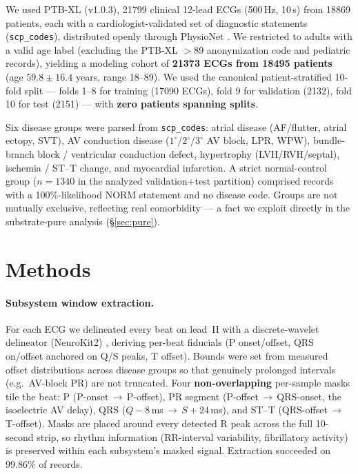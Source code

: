 \documentclass[11pt]{article}
\begin{document}
We used PTB-XL (v1.0.3), \num{21799} clinical 12-lead ECGs (500\,Hz, 10\,s) from \num{18869}
patients, each with a cardiologist-validated set of diagnostic statements
(\texttt{scp\_codes}), distributed openly through PhysioNet \citep{wagner2020ptbxl,
goldberger2000physionet}. We restricted to adults with a valid age label (excluding the
PTB-XL $>$89 anonymization code and pediatric records), yielding a modeling cohort of
\textbf{\num{21373} ECGs from \num{18495} patients} (age $59.8 \pm 16.4$ years, range 18--89).
We used the canonical patient-stratified 10-fold split --- folds 1--8 for training
(\num{17090} ECGs), fold 9 for validation (\num{2132}), fold 10 for test (\num{2151}) --- with
\textbf{zero patients spanning splits}.

Six disease groups were parsed from \texttt{scp\_codes}: atrial disease (AF/flutter, atrial
ectopy, SVT), AV conduction disease ($1^\circ$/$2^\circ$/$3^\circ$ AV block, LPR, WPW),
bundle-branch block / ventricular conduction defect, hypertrophy (LVH/RVH/septal), ischemia /
ST--T change, and myocardial infarction. A strict normal-control group ($n=\num{1340}$ in the
analyzed validation+test partition) comprised records with a 100\%-likelihood NORM statement
and no disease code. Groups are not mutually exclusive, reflecting real comorbidity --- a fact
we exploit directly in the substrate-pure analysis (\S\ref{sec:pure}).

\section{Methods}

\paragraph{Subsystem window extraction.}
For each ECG we delineated every beat on lead~II with a discrete-wavelet delineator
(NeuroKit2) \citep{makowski2021neurokit2}, deriving per-beat fiducials (P onset/offset, QRS
on/offset anchored on Q/S peaks, T offset). Bounds were set from measured offset distributions
across disease groups so that genuinely prolonged intervals (e.g.\ AV-block PR) are not
truncated. Four \textbf{non-overlapping} per-sample masks tile the beat: P
(P-onset\,$\rightarrow$\,P-offset), PR segment (P-offset\,$\rightarrow$\,QRS-onset, the
isoelectric AV delay), QRS ($Q-8$\,ms\,$\rightarrow$\,$S+24$\,ms), and ST--T
(QRS-offset\,$\rightarrow$\,T-offset). Masks are placed around every detected R peak across
the full 10-second strip, so rhythm information (RR-interval variability, fibrillatory
activity) is preserved within each subsystem's masked signal. Extraction succeeded on 99.86\%
of records.
\end{document}
